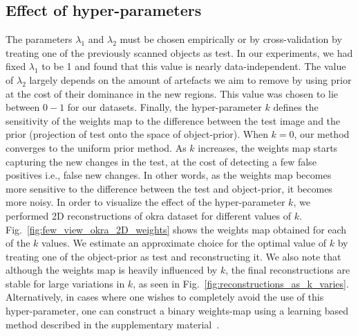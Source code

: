\documentclass[journal]{IEEEtran}
\begin{document}
\subsection{Effect of hyper-parameters}
\label{subsec:k}
The parameters $\lambda_1$ and $\lambda_2$ must be chosen empirically
or by cross-validation by treating one of the previously scanned
objects as test. In our experiments, we had fixed $\lambda_1$ to be 1
and found that this value is nearly data-independent. The value of
$\lambda_2$ largely depends on the amount of artefacts we aim to
remove by using prior at the cost of their dominance in the new
regions. This value was chosen to lie between $0-1$ for our
datasets. Finally, the hyper-parameter $k$ defines the sensitivity of
the weights map to the difference between the test image and the prior
(projection of test onto the space of object-prior). When $k=0$, our
method converges to the uniform prior method. As $k$ increases, the
weights map starts capturing the new changes in the test, at the cost
of detecting a few false positives i.e., false new changes. In other
words, as the weights map becomes more sensitive to the difference
between the test and object-prior, it becomes more noisy. In order to
visualize the effect of the hyper-parameter $k$, we performed 2D
reconstructions of okra dataset for different values of
$k$. Fig.~\ref{fig:few_view_okra_2D_weights} shows the weights map
obtained for each of the $k$ values. We estimate an approximate choice
for the optimal value of $k$ by treating one of the object-prior as
test and reconstructing it. We also note that although the weights map
is heavily influenced by $k$, the final reconstructions are stable for
large variations in $k$, as seen in
Fig.~\ref{fig:reconstructions_as_k_varies}. Alternatively, in cases
where one wishes to completely avoid the use of this hyper-parameter,
one can construct a binary weights-map using a learning based method
described in the supplementary material~\cite{supp_paper}.

\end{document}
